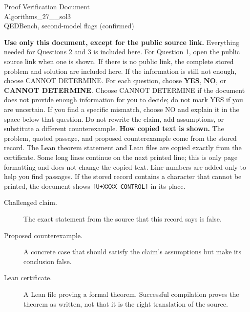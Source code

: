 \documentclass[11pt]{article}
\begin{document}
\begin{center}{\LARGE Proof Verification Document}\\[2pt]{\large Algorithms\_27\_\_sol3}\\[2pt]{\small QEDBench, second-model flags (confirmed)}\end{center}
\begin{center}\end{center}
\textbf{Use only this document, except for the public source link.} Everything needed for Questions 2 and 3 is included here. For Question 1, open the public source link when one is shown. If there is no public link, the complete stored problem and solution are included here. If the information is still not enough, choose CANNOT DETERMINE.
For each question, choose \textbf{YES}, \textbf{NO}, or \textbf{CANNOT DETERMINE}. Choose CANNOT DETERMINE if the document does not provide enough information for you to decide; do not mark YES if you are uncertain. If you find a specific mismatch, choose NO and explain it in the space below that question. Do not rewrite the claim, add assumptions, or substitute a different counterexample.
\textbf{How copied text is shown.} The problem, quoted passage, and proposed counterexample come from the stored record. The Lean theorem statement and Lean files are copied exactly from the certificate. Some long lines continue on the next printed line; this is only page formatting and does not change the copied text. Line numbers are added only to help you find passages. If the stored record contains a character that cannot be printed, the document shows \texttt{[U+XXXX CONTROL]} in its place.
\begin{description}
\item[Challenged claim.] The exact statement from the source that this record says is false.
\item[Proposed counterexample.] A concrete case that should satisfy the claim's assumptions but make its conclusion false.
\item[Lean certificate.] A Lean file proving a formal theorem. Successful compilation proves the theorem as written, not that it is the right translation of the source.
\end{description}
\end{document}
